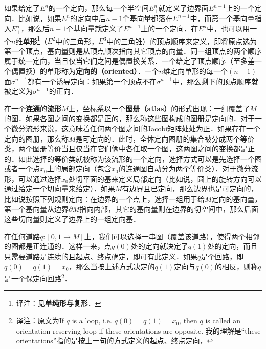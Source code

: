 如果给定了$E^n$的一个定向，那么每一个半空间$E^n_+$就定义了边界面$E^{n-1}$上的一个定向．比如说，如果$E^n$的定向中后$n-1$个基向量都落在$E^{n-1}$中，而第一个基向量指入$E^n_+$，那么后$n-1$个基向量就定义了$E^{n-1}$上的一个定向．在$E^n$中，也可以用一个$n$维\textbf{单形}\footnote{译注：见\textbf{单纯形与复形}．}（$E^2$中的三角形，$E^3$中的三角锥）的顶点顺序来定义，即将原点选为第一个顶点，基向量则是从顶点顺次指向其它顶点的向量．同一组顶点的两个顺序属于统一定向，当且仅当它们之间是偶置换关系．一个给定了顶点顺序（至多差一个偶置换）的单形称为\textbf{定向的（oriented）}．一个$n$维定向单形的每一个$(n-1)$-面$\sigma^{n-1}$都有一个诱导定向：如果第一个顶点不在$\sigma^{n-1}$中，那么剩下的顶点顺序就被定义为$\sigma^{n-1}$的正向．

在一个\textbf{连通}的\textbf{流形}$M$上，坐标系以一个\textbf{图册（atlas）}的形式出现：一组覆盖了$M$的图．如果各图之间的变换都是正的，那么称这些图构成的图册是定向的．对于一个微分流形来说，这意味着任何两个图之间的Jacobi矩阵处处为正．如果存在一个定向的图册，那么称$M$是可定向的．此时，全体定向图册的集合被分成两个等价类，两个图册等价当且仅当在它们俩中各任取一个图，这两图之间的变换都是正的．如此选择的等价类就被称为该流形的一个定向，选择方式可以是先选择一个图或者一个点$x_0$上的局部定向（包含$x_0$的连通图自动分为两个等价类）．对于微分流形，可以通过选择$x_0$处切平面的基来定义局部定向（比如说，圆上的旋转方向可以通过给定一个切向量来给定）．如果$M$有边界且已定向，那么边界也是可定向的，比如说按照下列规则定向：在边界的一个点上，选择一组用于给$M$定向的基向量，第一个基向量从边界$\partial M$指向内部，其它的基向量则在边界的切空间中，那么后面这些切向量则定义了边界上的一组定向基．


在任何道路$q:[0, 1\to M]$上，我们可以选择一串图（覆盖该道路），使得两个相邻的图都是正连通的．这样一来，点$q(0)$处的定向就决定了$q(1)$处的定向，而且只需要道路是连续的且起点、终点确定，即可有此定义．如果$q$是个回路，即$q(0)=q(1)=x_0$，那么当按上述方式决定的$q(1)$定向与$q(0)$的相反，则称$q$是一个保定向回路\footnote{译注：原文为If $q$ is a loop, i.e. $q(0)=q(1)=x_0$, then $q$ is called an orientation-reserving loop if these orientations are opposite. 我的理解是“these orientations”指的是按上一句的方式定义的起点、终点定向，}．

